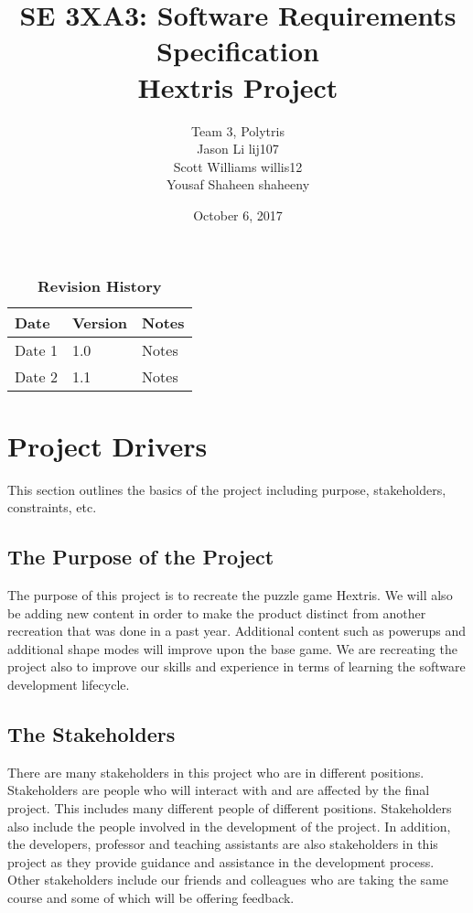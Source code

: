 \documentclass[12pt, titlepage]{article}
\title{SE 3XA3: Software Requirements Specification\\Hextris Project}
\author{Team 3, Polytris
		\\ Jason Li lij107
		\\ Scott Williams willis12
		\\ Yousaf Shaheen shaheeny
}
\date{October 6, 2017}
\begin{document}
\maketitle

\tableofcontents
\listoftables


\begin{table}[bp]
\caption{\bf Revision History}
\begin{tabularx}{\textwidth}{p{3cm}p{2cm}X}
\toprule {\bf Date} & {\bf Version} & {\bf Notes}\\
\midrule
Date 1 & 1.0 & Notes\\
Date 2 & 1.1 & Notes\\
\bottomrule
\end{tabularx}
\end{table}

\newpage


\section{Project Drivers}
This section outlines the basics of the project including purpose, stakeholders, constraints, etc. 

\subsection{The Purpose of the Project}
The purpose of this project is to recreate the puzzle game Hextris. We will also be adding new content in order to make the product distinct from another recreation that was done in a past year. Additional content such as powerups and additional shape modes will improve upon the base game. We are recreating the project also to improve our skills and experience in terms of learning the software development lifecycle.

\subsection{The Stakeholders}
There are many stakeholders in this project who are in different positions. Stakeholders are people who will interact with and are affected by the final project. This includes many different people of different positions. Stakeholders also include the people involved in the development of the project. In addition, the developers, professor and teaching assistants are also stakeholders in this project as they provide guidance and assistance in the development process. Other stakeholders include our friends and colleagues who are taking the same course and some of which will be offering feedback.
\end{document}

